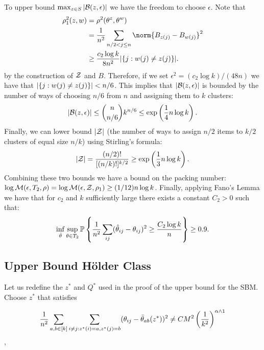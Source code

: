 \documentclass[11pt]{article}
\begin{document}
To upper bound $\max_{z \in S} |\mathcal{B}(z, \epsilon)|$ we have the freedom to choose $\epsilon$. Note that
\begin{equation}
\begin{aligned}
\rho_1^2(z, w) &= \rho^2(\theta^z, \theta^w) \\
               &= \frac{1}{n^2} \sum_{n/2 < j \leq n}\norm{B_{z(j)} - B_{w(j)}}^2 \\
               &\geq \frac{c_2 \log k}{8 n^2} |\set{j : w(j) \neq z(j)}|.
\end{aligned}
\end{equation}
by the construction of $\mathcal{Z}$ and $B$. Therefore, if we set $\epsilon^2 = (c_2 \log k)/(48 n)$ we have that $|\{j : w(j) \neq z(j)\}| < n/6$. This implies that $|\mathcal{B}(z, \epsilon)|$ is bounded by the number of ways of choosing $n/6$ from $n$ and assigning them to $k$ clusters:
\begin{equation}
|\mathcal{B}(z, \epsilon)| \leq {n \choose n/6} k^{n/6} \leq \exp\left(\frac{1}{4} n \log k\right).
\end{equation}
Finally, we can lower bound $|\mathcal{Z}|$ (the number of ways to assign $n/2$ items to $k/2$ clusters of equal size $n/k$) using Stirling's formula:
\begin{equation}
|\mathcal{Z}| = \frac{(n/2)!}{[(n/k)!]^{k/2}} \geq \exp\left(\frac{1}{3} n \log k\right).
\end{equation}
Combining these two bounds we have a bound on the packing number: $\log \mathcal{M}(\epsilon, T_2, \rho) = \log \mathcal{M}(\epsilon, \mathcal{Z}, \rho_1) \geq (1/12) n \log k$. Finally, applying Fano's Lemma we have that for $c_2$ and $k$ sufficiently large there exists a constant $C_2 > 0$ such that:
\begin{equation}
\inf_{\hat{\theta}} \sup_{\theta \in T_2} \mathbb{P} \left\{ \frac{1}{n^2} \sum_{ij} (\hat{\theta}_{ij} - \theta_{ij})^2 \geq \frac{C_2 \log k}{n} \right\} \geq 0.9.
\end{equation}

\subsection{Upper Bound H\"older Class} \label{sec:upper_hold}

Let us redefine the $z^\ast$ and $Q^\ast$ used in the proof of the upper bound for the SBM. Choose $z^\ast$ that satisfies

\[ \frac{1}{n^2} \sum_{a,b\in \lbrack k\rbrack} \sum_{i\neq j: z^\ast(i)=a, z^\ast(j)=b} (\theta_{ij} -\bar{\theta}_{ab}(z^\ast)  )^2 \neq CM^2 \left( \frac{1}{k^2} \right)^{\alpha \wedge 1}  \],
\end{document}
